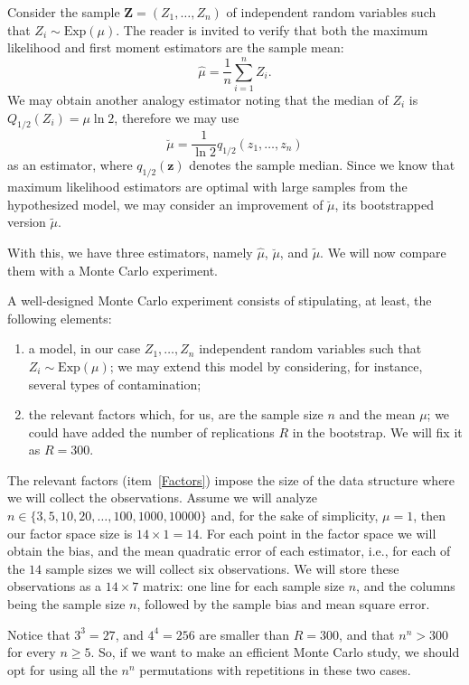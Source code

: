 Consider the sample $\bm Z=(Z_1,\dots,Z_n)$ of independent random variables such that $Z_i\sim \text{Exp}(\mu)$.
The reader is invited to verify that both the maximum likelihood and first moment estimators are the sample mean:
\begin{equation}
\widehat\mu = \frac{1}{n}\sum_{i=1}^n Z_i.
\end{equation}
We may obtain another analogy estimator noting that the median of $Z_i$ is $Q_{1/2}(Z_i)=\mu\ln 2$, therefore we may use
\begin{equation}
\breve{\mu} = \frac{1}{\ln 2} q_{1/2} (z_1,\dots,z_n)
\end{equation}
as an estimator, where $q_{1/2}(\bm z)$ denotes the sample median.
Since we know that maximum likelihood estimators are optimal with large samples from the hypothesized model, we may consider an improvement of $\breve{\mu}$, its bootstrapped version $\widetilde{\mu}$.

With this, we have three estimators, namely $\widehat{\mu}$, $\breve{\mu}$, and $\widetilde{\mu}$.
We will now compare them with a Monte Carlo experiment.

A well-designed Monte Carlo experiment consists of stipulating, at least, the following elements:
\begin{enumerate}
\item a model, in our case $Z_1,\dots,Z_n$ independent random variables such that $Z_i\sim \text{Exp}(\mu)$; we may extend this model by considering, for instance, several types of contamination;
\item\label{Factors} the relevant factors which, for us, are the sample size $n$ and the mean $\mu$; we could have added the number of replications $R$ in the bootstrap. 
We will fix it as $R=300$.
\end{enumerate}

The relevant factors (item~\ref{Factors}) impose the size of the data structure where we will collect the observations.
Assume we will analyze $n\in\{3,5,10,20,\dots,100,1000,10000\}$ and, for the sake of simplicity, $\mu=1$, then our factor space size is $14\times1=14$.
For each point in the factor space we will obtain the bias, and the mean quadratic error of each estimator, i.e., for each of the $14$ sample sizes we will collect six observations.
We will store these observations as a $14\times 7$ matrix: one line for each sample size $n$, and the columns being the sample size $n$, followed by the sample bias and mean square error.

Notice that $3^3=27$, and $4^4=256$ are smaller than $R=300$, and that $n^n>300$ for every $n\geq5$.
So, if we want to make an efficient Monte Carlo study, we should opt for using all the $n^n$ permutations with repetitions in these two cases.

